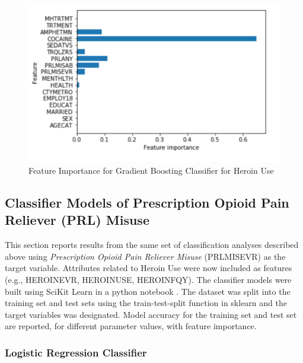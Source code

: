 \documentclass[sigconf]{acmart}
\begin{document}
\begin{figure}[!ht]
  \centering\includegraphics[width=\columnwidth]{images/Figure7.pdf}
  \caption{Feature Importance for Gradient Boosting Classifier for Heroin Use}
  \label{f:Figure7}
\end{figure}


\subsection{Classifier Models of Prescription Opioid Pain Reliever (PRL) Misuse}

This section reports results from the same set of classification analyses
described above using \emph{Prescription Opioid Pain Reliever Misuse} 
(PRLMISEVR) as the target variable. Attributes related to Heroin Use were 
now included as features (e.g., HEROINEVR, HEROINUSE, HEROINFQY). The 
classifier models were built using SciKit Learn in a python notebook 
\cite{classifyPRL}. The dataset was split into the training set and test 
sets using the train-test-split function in sklearn and the target variables 
was designated. Model accuracy for the training set and test set are reported, 
for different parameter values, with feature importance. 


\subsubsection{Logistic Regression Classifier}
\end{document}
